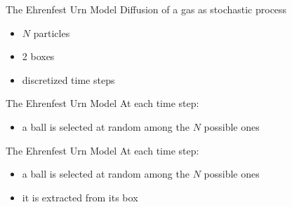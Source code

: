 \begin{frame}{The Ehrenfest Urn Model} %
    Diffusion of a gas as \alert{stochastic process}
    \begin{itemize}
      \item $N$ particles
      \item 2 boxes
      \item discretized time steps
    \end{itemize}
   
    \begin{figure}
      \begin{center}
        
      \end{center}
    \end{figure}

  \end{frame}

  \begin{frame}{The Ehrenfest Urn Model} %
    At each time step:
    \begin{itemize}
      \item \alert{a ball is selected at random among the $N$ possible ones}
    \end{itemize}

    \medskip
    \begin{figure}[b]
      \begin{center}
        
      \end{center}
    \end{figure}
  \end{frame}

  \begin{frame}{The Ehrenfest Urn Model} %
    At each time step:
    \begin{itemize}
      \item a ball is selected at random among the $N$ possible ones
      \item \alert{it is extracted from its box}
    \end{itemize}

    \medskip
    \begin{figure}[b]
      \begin{center}
        
      \end{center}
    \end{figure}
  \end{frame}

